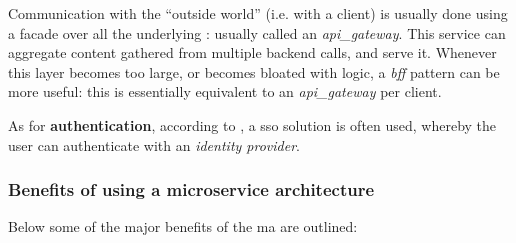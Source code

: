 Communication with the ``outside world'' (i.e. with a client) is usually done
using a facade over all the underlying : usually called
an \textit{\gls{api_gateway}}. This service can aggregate content gathered from
multiple backend calls, and serve it. Whenever this layer becomes too large, or
becomes bloated with logic, a \textit{\gls{bff}} pattern can be more useful:
this is essentially equivalent to an \textit{\gls{api_gateway}} per client.


As for \textbf{authentication}, according to \textcite{Newman_2015}, a \gls{sso}
solution is often used, whereby the user can authenticate with an
\textit{identity provider}.


\subsubsection{Benefits of using a microservice architecture}

Below some of the major benefits of the \gls{ma} are outlined:

